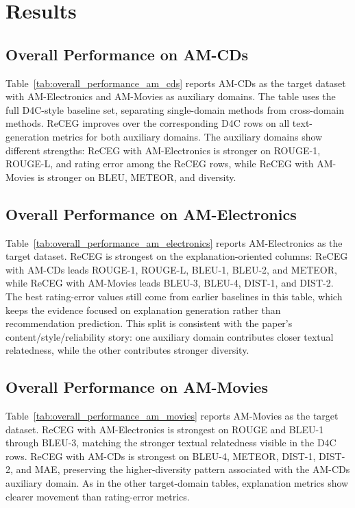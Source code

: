 \section{Results}

\subsection{Overall Performance on AM-CDs}



Table~\ref{tab:overall_performance_am_cds} reports AM-CDs as the target
dataset with AM-Electronics and AM-Movies as auxiliary domains. The table uses
the full D4C-style baseline set, separating single-domain methods from
cross-domain methods. ReCEG improves over the corresponding D4C rows on all
text-generation metrics for both auxiliary domains. The auxiliary domains show
different strengths: ReCEG with AM-Electronics is stronger on ROUGE-1,
ROUGE-L, and rating error among the ReCEG rows, while ReCEG with AM-Movies is
stronger on BLEU, METEOR, and diversity.

\subsection{Overall Performance on AM-Electronics}



Table~\ref{tab:overall_performance_am_electronics} reports AM-Electronics as
the target dataset. ReCEG is strongest on the explanation-oriented columns:
ReCEG with AM-CDs leads ROUGE-1, ROUGE-L, BLEU-1, BLEU-2, and METEOR, while
ReCEG with AM-Movies leads BLEU-3, BLEU-4, DIST-1, and DIST-2. The best
rating-error values still come from earlier baselines in this table, which
keeps the evidence focused on explanation generation rather than recommendation
prediction. This split is consistent with the paper's content/style/reliability
story: one auxiliary domain contributes closer textual relatedness, while the
other contributes stronger diversity.

\subsection{Overall Performance on AM-Movies}



Table~\ref{tab:overall_performance_am_movies} reports AM-Movies as the target
dataset. ReCEG with AM-Electronics is strongest on ROUGE and BLEU-1 through
BLEU-3, matching the stronger textual relatedness visible in the D4C rows.
ReCEG with AM-CDs is strongest on BLEU-4, METEOR, DIST-1, DIST-2, and MAE,
preserving the higher-diversity pattern associated with the AM-CDs auxiliary
domain. As in the other target-domain tables, explanation metrics show clearer
movement than rating-error metrics.

